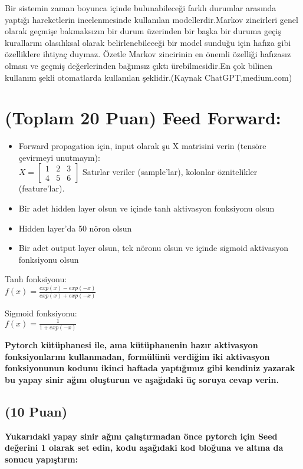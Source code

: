 \documentclass[11pt]{article}
\begin{document}
Bir sistemin zaman boyunca içinde bulunabileceği farklı durumlar arasında yaptığı hareketlerin incelenmesinde kullanılan modellerdir.Markov zincirleri genel olarak geçmişe bakmaksızın bir durum üzerinden bir başka bir duruma geçiş kurallarını olasılıksal olarak belirlenebileceği bir model sunduğu için hafıza gibi özelliklere ihtiyaç duymaz. Özetle Markov zincirinin en önemli özelliği hafızasız olması ve geçmiş değerlerinden bağımsız çıktı ürebilmesidir.En çok bilinen kullanım şekli otomatlarda kullanılan şeklidir.(Kaynak ChatGPT,medium.com)

\section{(Toplam 20 Puan) Feed Forward:}
 
\begin{itemize}
    \item Forward propagation için, input olarak şu X matrisini verin (tensöre çevirmeyi unutmayın):\\
    $X = \begin{bmatrix}
        1 & 2 & 3\\
        4 & 5 & 6
        \end{bmatrix}$
    Satırlar veriler (sample'lar), kolonlar öznitelikler (feature'lar).
    \item Bir adet hidden layer olsun ve içinde tanh aktivasyon fonksiyonu olsun
    \item Hidden layer'da 50 nöron olsun
    \item Bir adet output layer olsun, tek nöronu olsun ve içinde sigmoid aktivasyon fonksiyonu olsun
\end{itemize}

Tanh fonksiyonu:\\
$f(x) = \frac{exp(x) - exp(-x)}{exp(x) + exp(-x)}$
\vspace{.2in}

Sigmoid fonksiyonu:\\
$f(x) = \frac{1}{1 + exp(-x)}$

\vspace{.2in}
 \textbf{Pytorch kütüphanesi ile, ama kütüphanenin hazır aktivasyon fonksiyonlarını kullanmadan, formülünü verdiğim iki aktivasyon fonksiyonunun kodunu ikinci haftada yaptığımız gibi kendiniz yazarak bu yapay sinir ağını oluşturun ve aşağıdaki üç soruya cevap verin.}
 
\subsection{(10 Puan)} \textbf{Yukarıdaki yapay sinir ağını çalıştırmadan önce pytorch için Seed değerini 1 olarak set edin, kodu aşağıdaki kod bloğuna ve altına da sonucu yapıştırın:}
\end{document}
